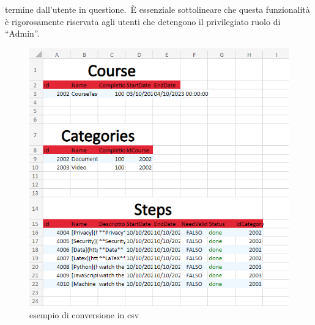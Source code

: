 termine dall'utente in questione.\ È essenziale sottolineare che questa funzionalità è rigorosamente riservata agli 
utenti che detengono il privilegiato ruolo di ``Admin''.
%
\begin{figure}[H]
	\centering
	\includegraphics[width=\textwidth]{img/exportToExcel.png}
	\caption{esempio di conversione in csv}
	\label{fig:exportToExcel}
\end{figure}
%
